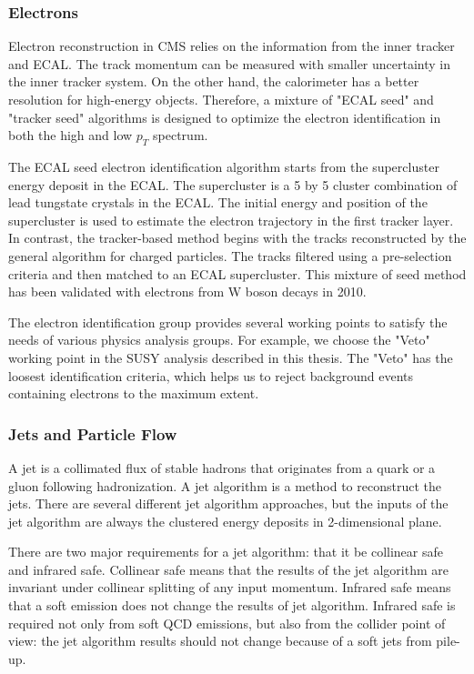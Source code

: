 \subsubsection{Electrons}
Electron reconstruction in CMS relies on the information from the inner tracker and ECAL. The track momentum can be measured with smaller uncertainty in the inner tracker system. On the other hand, the calorimeter has a better resolution for high-energy objects. Therefore, a mixture of "ECAL seed" and "tracker seed" algorithms is designed to optimize the electron identification in both the high and low $p_{T}$ spectrum. 

The ECAL seed electron identification algorithm starts from the supercluster energy deposit in the ECAL. The supercluster is a 5 by 5 cluster combination of lead tungstate crystals in the ECAL. The initial energy and position of the supercluster is used to estimate the electron trajectory in the first tracker layer. In contrast, the tracker-based method begins with the tracks reconstructed by the general algorithm for charged particles. The tracks filtered using a pre-selection criteria and then matched to an ECAL supercluster. This mixture of seed method has been validated with electrons from W boson decays in 2010\cite{Khachatryan:2015hwa}. 

The electron identification group provides several working points to satisfy the needs of various physics analysis groups. For example, we choose the "Veto" working point in the SUSY analysis described in this thesis. The "Veto" has the loosest identification criteria, which helps us to reject background events containing electrons to the maximum extent. 
\subsubsection{Jets and Particle Flow}

A jet is a collimated flux of stable hadrons that originates from a quark or a gluon following hadronization. A jet algorithm is a method to reconstruct the jets. There are several different jet algorithm approaches, but the inputs of the jet algorithm are always the clustered energy deposits in 2-dimensional plane. 

There are two major requirements for a jet algorithm: that it be collinear safe and infrared safe. Collinear safe means that the results of the jet algorithm are invariant under collinear splitting of any input momentum. Infrared safe means that a soft emission does not change the results of jet algorithm. Infrared safe is required not only from soft QCD emissions, but also from the collider point of view: the jet algorithm results should not change because of a soft jets from pile-up. 

